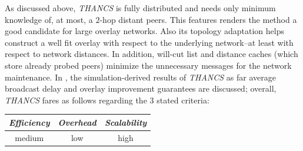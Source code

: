 %
%
%

As discussed above, \emph{THANCS} is fully distributed and needs only minimum knowledge
of, at most, a $2$-hop distant peers. This features renders 
the method a good candidate for large overlay networks. 
Also its topology adaptation helps construct a well fit overlay
with respect to the underlying network--at least with respect to network
distances. In addition, will-cut list and distance caches (which store already
probed peers) minimize the unnecessary messages for the network maintenance.
In \cite{HLY2010}, the simulation-derived results of \emph{THANCS} as far
average broadcast delay and overlay improvement guarantees are discussed;
overall, \emph{THANCS} fares as follows regarding the $3$ stated criteria:

\begin{center}
{\footnotesize
\begin{tabular}{ccc}
\emph{Efficiency} & \emph{Overhead} & \emph{Scalability} \\
\hline
% 
medium &
low &
high
\end{tabular}
}
\end{center}

